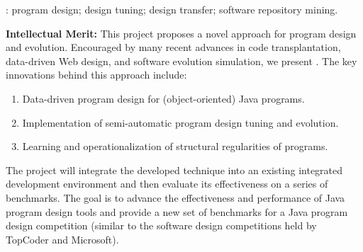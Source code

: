 

\medskip{}: program design; design tuning; 
design transfer; software repository mining.   

\medskip\noindent
{\bf{Intellectual Merit:}} 
% 
This project proposes a novel approach for program design and 
evolution. Encouraged by many recent advances in code transplantation, 
data-driven Web design, and software evolution simulation, we 
present \pdm. The key innovations behind this approach include:

\begin{enumerate}
	\item Data-driven program design for (object-oriented) Java programs.
	\item Implementation of semi-automatic program design tuning and evolution.
	\item Learning and operationalization of structural regularities of programs.
\end{enumerate}

\noindent
The project will integrate the developed \pdm technique into an existing 
integrated development environment and then evaluate its effectiveness 
on a series of benchmarks. The goal is to advance the effectiveness and 
performance of Java program design tools and provide a new set of benchmarks 
for a Java program design competition (similar to the software design 
competitions held by TopCoder and Microsoft).


